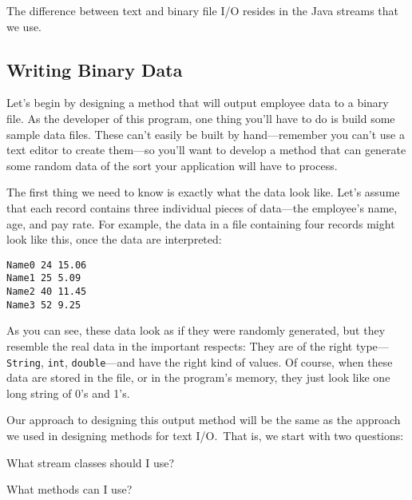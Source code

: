 \noindent The difference between text and binary file I/O resides
in the Java streams that we use.

\subsection{Writing Binary Data}
\noindent Let's begin by designing a method that will output employee data to a
binary file.  As the developer of this program, one thing you'll have
to do is build some sample data files.  These can't easily be built
by hand---remember you can't use a text editor to create them---so
you'll want to develop a method that can generate some random data
of the sort your application will have to process.


\noindent The first thing we need to know is exactly what the data look
like.  Let's assume that each record contains three individual pieces
of data---the employee's name, age, and pay rate.  For example, the
data in a file containing four records might look like this, once the
data are interpreted:

\begin{jjjlisting}
\begin{lstlisting}
Name0 24 15.06
Name1 25 5.09
Name2 40 11.45
Name3 52 9.25
\end{lstlisting}
\end{jjjlisting}

\noindent As you can see, these data look as if they were randomly
generated, but they resemble the real data in the important respects:
They are of the right type---{\tt String}, {\tt int}, {\tt double}---and have 
the right kind of values.   Of course, when these data are stored in the
file, or in the program's memory, they just look like one long string
of 0's and 1's.

Our approach to designing this output method will be the same
as the approach we used in designing methods for text I/O.~That is,
we start with two questions:

\begin{BL}
\item  What stream classes should I use?
\item  What methods can I use?
\end{BL}

